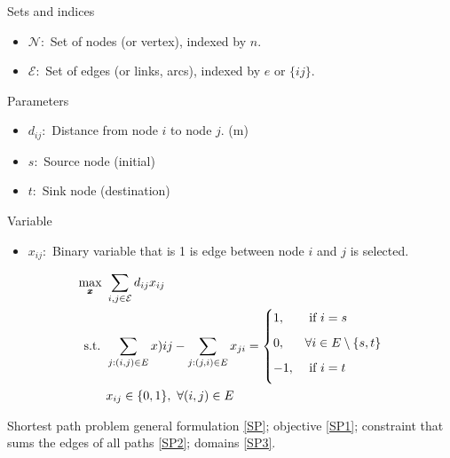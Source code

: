 \documentclass[10pt,bezier]{article}
\begin{document}
\noindent Sets and indices
\begin{itemize}
  \item $\mathcal{N}$:~Set of nodes (or vertex), indexed by $n$.
  \item $\mathcal{E}$:~Set of edges (or links, arcs), indexed by $e$ or $\{ij\}$.
\end{itemize}
Parameters
\begin{itemize}
    \item $d_{ij}$:~Distance from node $i$ to node $j$. (m)
    \item $s$:~Source node (initial)
    \item $t$:~Sink node (destination)
\end{itemize}
Variable
\begin{itemize}
    \item $x_{ij}$:~Binary variable that is 1 is edge between node $i$ and $j$ is selected.
\end{itemize}

\begin{subequations}\label{SP}
    \begin{align}
    \max_{\pmb{x}} ~& \sum_{i,j \in \mathcal{E}} d_{ij} x_{ij} \label{SP1}\\
    \text{s.t. } & \sum_{j:(i,j)\in E} x){ij} - \sum_{j:(j,i) \in E} x_{ji} =
                \begin{cases}
                    \vspace{0.2cm} 1, &\text{ if } i = s\\
                    \vspace{0.2cm} 0, &\forall i \in E \setminus \{s,t\}\\
                    \vspace{0.2cm} -1, &\text{ if } i = t
                \end{cases} \label{SP2}\\
                 & x_{ij} \in \{0,1\},~\forall (i,j) \in E \label{SP3}
    \end{align}
\end{subequations}

Shortest path problem general formulation \eqref{SP}; objective \eqref{SP1}; constraint that sums the edges of all paths \eqref{SP2}; domains \eqref{SP3}.
\end{document}
